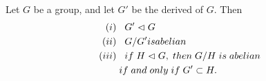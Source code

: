\begin{teo}
    Let $G$ be a group, and let $G'$ be the derived of $G$. Then
    \begin{align*}
    (i)&\hspace{.3cm}G'\vartriangleleft G\\
    (ii)&\hspace{.3cm}G/G' is abelian\\
    (iii)&\hspace{.3cm}if\hspace{.1cm}H\vartriangleleft G,\hspace{.1cm} then\hspace{.1cm} G/H \hspace{.1cm}is \hspace{.1cm}abelian\\
    &\hspace{.1cm} if\hspace{.1cm} and\hspace{.1cm} only \hspace{.1cm}if\hspace{.1cm} G'\subset H.
\end{align*}
\end{teo}
